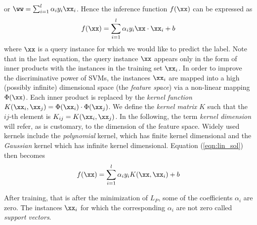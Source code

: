 or $\ww = \sum_{i=1}^l \alpha_i y_i \xx_i$. Hence the inference function $f(\xx)$ can be expressed as
\begin{equation} \label{eqn:lin_sol}
  f(\xx) = \sum_{i=1}^l \alpha_i y_i \xx \cdot \xx_i + b
\end{equation}
where $\xx$ is a query instance for which we would like to predict the label.
Note that in the last equation, the query instance $\xx$
appears only in the form of inner products with the instances in the training set $\xx_i$.
In order to improve the discriminative power of SVMs, the instances $\xx_i$ are  mapped into
a high (possibly infinite) dimensional space (the \emph{feature
space}) via a non-linear mapping $\Phi(\xx)$. Each inner product is replaced by the \emph{kernel function} $K(\xx_i,\xx_j) = \Phi(\xx_i)\cdot \Phi(\xx_j)$. We define the \emph{kernel matrix} $K$ such that the $ij$-th element is $K_{ij} = K(\xx_i,\xx_j)$.
In the following, the term
\emph{kernel dimension} will refer, as is customary, to the dimension
of the feature space.
Widely used kernels include the \emph{polynomial}
kernel, which has finite kernel dimensional and the \emph{Gaussian} kernel
which has infinite kernel dimensional. Equation (\ref{eqn:lin_sol}) then becomes
\begin{equation} \label{eqn:sol}
  f(\xx) = \sum_{i=1}^l \alpha_i y_i K(\xx,\xx_i) + b
\end{equation}

After training, that is after the minimization of $L_P$, some of the coefficients 
$\alpha_i$ are
zero. The instances $\xx_i$ for which the corresponding $\alpha_i$ are not zero called
\emph{support vectors}. 

